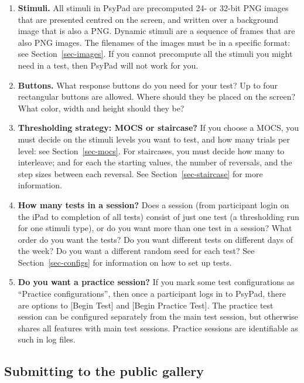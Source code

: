 \documentclass{article}
\begin{document}
\begin{enumerate}

\item {\bf Stimuli.} All stimuli in PsyPad are precomputed 
24- or 32-bit PNG
images that are presented centred on the screen, and written over a background image that is also a PNG.
Dynamic stimuli are a sequence of frames that are also
PNG images.  The filenames of the images must be in
a specific format: see Section~\ref{sec-images}.
If you cannot precompute all the stimuli you might need in a test, then
PsyPad will not work for you.

\item {\bf Buttons.} What response buttons do you need for your test?  
Up to four
rectangular buttons are allowed. Where
should they be placed on the screen? 
What color, width and height
should they be?

\item {\bf Thresholding strategy: MOCS or staircase?}
If you choose a MOCS, you must decide on the stimuli levels you want to
test, and how many trials per level: see Section~\ref{sec-mocs}.
For staircases, you must decide how many to interleave; and for each the starting
values, the number of reversals, and the step sizes between each reversal.
See Section~\ref{sec-staircase} for more information.

\item {\bf How many tests in a session?}
Does a session (from participant login on the iPad
to completion of all tests) consist of just one
test (a thresholding run for one stimuli type), or do you want more than one test
in a session?  What order do you
want the tests? Do you want different tests on different days of the week?
Do you want a different random seed for each test?
See Section~\ref{sec-configs} for information on how to set up tests.

\item {\bf Do you want a practice session?}
If you mark some test configurations as ``Practice configurations'', then 
once a participant logs in to PsyPad, there are options 
to [Begin Test] and [Begin Practice Test].
The practice test session can be configured separately 
from the main test session, but otherwise shares all features with 
main test sessions. Practice sessions are identifiable as such in log
files.

\end{enumerate}

\subsection{Submitting to the public gallery}
\label{sec-submittingConfigurations}
\end{document}

